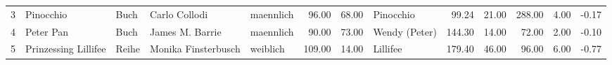 \begin{sidewaystable}[ht]
\begin{center}
{\begin{tabular}{rllllrrlrrrrr}
  3 & Pinocchio                                                                                                                                                                                                                                                       & Buch & Carlo Collodi                                                                                                                                                                                                                                                   & maennlich & 96.00 & 68.00 & Pinocchio                                                                                                                                                                                                                                                       & 99.24 & 21.00 & 288.00 & 4.00 & -0.17 \\ 
  4 & Peter Pan                                                                                                                                                                                                                                                       & Buch & James M. Barrie                                                                                                                                                                                                                                                 & maennlich & 90.00 & 73.00 & Wendy (Peter)                                                                                                                                                                                                                                                   & 144.30 & 14.00 & 72.00 & 2.00 & -0.10 \\ 
  5 & Prinzessing Lillifee                                                                                                                                                                                                                                            & Reihe & Monika Finsterbusch                                                                                                                                                                                                                                             & weiblich & 109.00 & 14.00 & Lillifee                                                                                                                                                                                                                                                        & 179.40 & 46.00 & 96.00 & 6.00 & -0.77 \\ 

\end{tabular}}
\end{center}
\end{sidewaystable}
